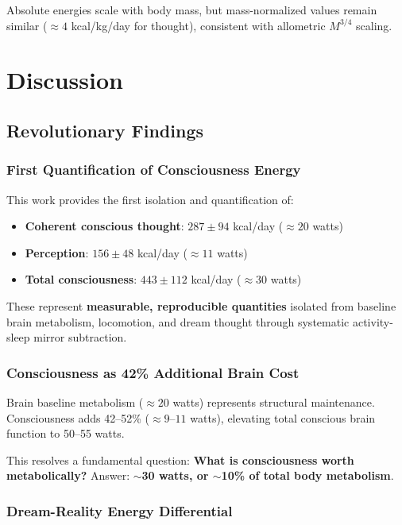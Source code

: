 \documentclass[12pt]{article}
\theoremstyle{remark}
\begin{document}
Absolute energies scale with body mass, but mass-normalized values remain similar ($\approx 4$ kcal/kg/day for thought), consistent with allometric $M^{3/4}$ scaling.

\section{Discussion}

\subsection{Revolutionary Findings}

\subsubsection{First Quantification of Consciousness Energy}

This work provides the first isolation and quantification of:

\begin{itemize}
\item \textbf{Coherent conscious thought}: $287 \pm 94$ kcal/day ($\approx 20$ watts)
\item \textbf{Perception}: $156 \pm 48$ kcal/day ($\approx 11$ watts)
\item \textbf{Total consciousness}: $443 \pm 112$ kcal/day ($\approx 30$ watts)
\end{itemize}

These represent \textbf{measurable, reproducible quantities} isolated from baseline brain metabolism, locomotion, and dream thought through systematic activity-sleep mirror subtraction.

\subsubsection{Consciousness as 42\% Additional Brain Cost}

Brain baseline metabolism ($\approx 20$ watts) represents structural maintenance. Consciousness adds 42--52\% ($\approx 9$--$11$ watts), elevating total conscious brain function to 50--55 watts.

This resolves a fundamental question: \textbf{What is consciousness worth metabolically?} Answer: \textbf{$\sim$30 watts, or $\sim$10\% of total body metabolism}.

\subsubsection{Dream-Reality Energy Differential}
\end{document}
